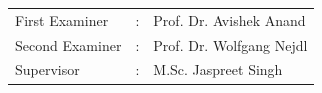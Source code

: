 \begin{titlepage}
\begin{addmargin}[-1cm]{-3cm}
\begin{center}
        \vfill
        
        \begin{tabular}{lll}
              First Examiner  & :  & Prof. Dr. Avishek Anand \\
              Second Examiner & :& Prof. Dr. Wolfgang Nejdl \\
              Supervisor      & : & M.Sc. Jaspreet Singh
        \end{tabular}

        \vfill                      

    \end{center}  
  \end{addmargin}       
\end{titlepage}   
